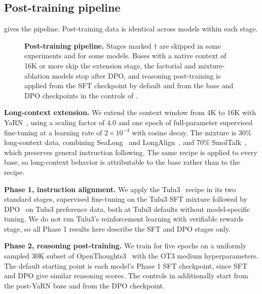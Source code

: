 \documentclass{article}
\begin{document}
\subsection{Post-training pipeline}
\label{sec:methods-posttrain}

 gives the pipeline. Post-training data is identical across models within each stage.

\begin{figure}[t]
\centering
\resizebox{\linewidth}{!}{}
\caption{\textbf{Post-training pipeline.} Stages marked $\dagger$ are skipped in some experiments and for some models. Bases with a native context of 16K or more skip the extension stage, the factorial and mixture-ablation models stop after DPO, and reasoning post-training is applied from the SFT checkpoint by default and from the base and DPO checkpoints in the controls of .}
\label{fig:pipeline}
\end{figure}

\textbf{Long-context extension.} We extend the context window from 4K to 16K with YaRN~\citep{peng2023yarn}, using a scaling factor of $4.0$ and one epoch of full-parameter supervised fine-tuning at a learning rate of $2 \times 10^{-4}$ with cosine decay. The mixture is 30\% long-context data, combining SeaLong~\citep{li2024sealong} and LongAlign~\citep{bai2024longalign}, and 70\% SmolTalk~\citep{allal2025smollm2}, which preserves general instruction following. The same recipe is applied to every base, so long-context behavior is attributable to the base rather than to the recipe.

\textbf{Phase 1, instruction alignment.} We apply the Tulu3~\citep{lambert2024tulu} recipe in its two standard stages, supervised fine-tuning on the Tulu3 SFT mixture followed by DPO~\citep{rafailov2023direct} on Tulu3 preference data, both at Tulu3 defaults without model-specific tuning. We do not run Tulu3's reinforcement learning with verifiable rewards stage, so all Phase 1 results here describe the SFT and DPO stages only.

\textbf{Phase 2, reasoning post-training.} We train for five epochs on a uniformly sampled 30K subset of OpenThoughts3~\citep{guha2025openthoughts} with the OT3 medium hyperparameters. The default starting point is each model's Phase 1 SFT checkpoint, since SFT and DPO give similar reasoning scores. The controls in  additionally start from the post-YaRN base and from the DPO checkpoint.
\end{document}
